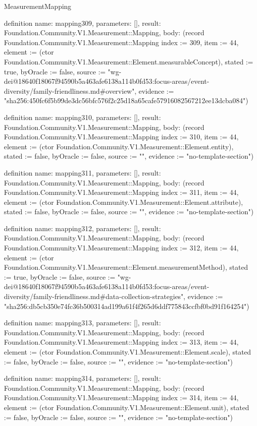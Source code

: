 \begin{lexlean}{MeasurementMapping}
\begin{semanticmodule}
definition{
  name: mapping309,
  parameters: [],
  result: Foundation.Community.V1.Measurement::Mapping,
  body: (record Foundation.Community.V1.Measurement::Mapping {index := 309, item := 44, element := (ctor Foundation.Community.V1.Measurement::Element.measurableConcept), stated := true, byOracle := false, source := "wg-dei@18640f18067f94590b5a463afe6138a114b0fd53:focus-areas/event-diversity/family-friendliness.md#overview", evidence := "sha256:450fc6f5b99de3dc56bfc576f2c25d18a65cafe57916082567212ee13dcba084"})
}

definition{
  name: mapping310,
  parameters: [],
  result: Foundation.Community.V1.Measurement::Mapping,
  body: (record Foundation.Community.V1.Measurement::Mapping {index := 310, item := 44, element := (ctor Foundation.Community.V1.Measurement::Element.entity), stated := false, byOracle := false, source := "", evidence := "no-template-section"})
}

definition{
  name: mapping311,
  parameters: [],
  result: Foundation.Community.V1.Measurement::Mapping,
  body: (record Foundation.Community.V1.Measurement::Mapping {index := 311, item := 44, element := (ctor Foundation.Community.V1.Measurement::Element.attribute), stated := false, byOracle := false, source := "", evidence := "no-template-section"})
}

definition{
  name: mapping312,
  parameters: [],
  result: Foundation.Community.V1.Measurement::Mapping,
  body: (record Foundation.Community.V1.Measurement::Mapping {index := 312, item := 44, element := (ctor Foundation.Community.V1.Measurement::Element.measurementMethod), stated := true, byOracle := false, source := "wg-dei@18640f18067f94590b5a463afe6138a114b0fd53:focus-areas/event-diversity/family-friendliness.md#data-collection-strategies", evidence := "sha256:db5cb350e74fc36b500314ad199a61f4f265d6ddf775843ccfbf0bd91f164254"})
}

definition{
  name: mapping313,
  parameters: [],
  result: Foundation.Community.V1.Measurement::Mapping,
  body: (record Foundation.Community.V1.Measurement::Mapping {index := 313, item := 44, element := (ctor Foundation.Community.V1.Measurement::Element.scale), stated := false, byOracle := false, source := "", evidence := "no-template-section"})
}

definition{
  name: mapping314,
  parameters: [],
  result: Foundation.Community.V1.Measurement::Mapping,
  body: (record Foundation.Community.V1.Measurement::Mapping {index := 314, item := 44, element := (ctor Foundation.Community.V1.Measurement::Element.unit), stated := false, byOracle := false, source := "", evidence := "no-template-section"})
}


\end{semanticmodule}
\end{lexlean}
